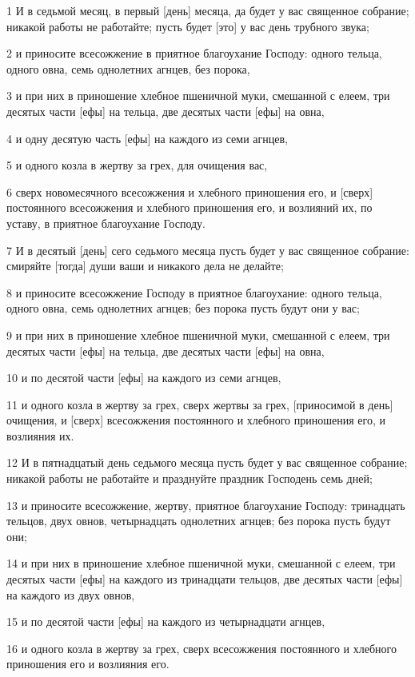 \par 1 И в седьмой месяц, в первый [день] месяца, да будет у вас священное собрание; никакой работы не работайте; пусть будет [это] у вас день трубного звука;
\par 2 и приносите всесожжение в приятное благоухание Господу: одного тельца, одного овна, семь однолетних агнцев, без порока,
\par 3 и при них в приношение хлебное пшеничной муки, смешанной с елеем, три десятых части [ефы] на тельца, две десятых части [ефы] на овна,
\par 4 и одну десятую часть [ефы] на каждого из семи агнцев,
\par 5 и одного козла в жертву за грех, для очищения вас,
\par 6 сверх новомесячного всесожжения и хлебного приношения его, и [сверх] постоянного всесожжения и хлебного приношения его, и возлияний их, по уставу, в приятное благоухание Господу.
\par 7 И в десятый [день] сего седьмого месяца пусть будет у вас священное собрание: смиряйте [тогда] души ваши и никакого дела не делайте;
\par 8 и приносите всесожжение Господу в приятное благоухание: одного тельца, одного овна, семь однолетних агнцев; без порока пусть будут они у вас;
\par 9 и при них в приношение хлебное пшеничной муки, смешанной с елеем, три десятых части [ефы] на тельца, две десятых части [ефы] на овна,
\par 10 и по десятой части [ефы] на каждого из семи агнцев,
\par 11 и одного козла в жертву за грех, сверх жертвы за грех, [приносимой в день] очищения, и [сверх] всесожжения постоянного и хлебного приношения его, и возлияния их.
\par 12 И в пятнадцатый день седьмого месяца пусть будет у вас священное собрание; никакой работы не работайте и празднуйте праздник Господень семь дней;
\par 13 и приносите всесожжение, жертву, приятное благоухание Господу: тринадцать тельцов, двух овнов, четырнадцать однолетних агнцев; без порока пусть будут они;
\par 14 и при них в приношение хлебное пшеничной муки, смешанной с елеем, три десятых части [ефы] на каждого из тринадцати тельцов, две десятых части [ефы] на каждого из двух овнов,
\par 15 и по десятой части [ефы] на каждого из четырнадцати агнцев,
\par 16 и одного козла в жертву за грех, сверх всесожжения постоянного и хлебного приношения его и возлияния его.
